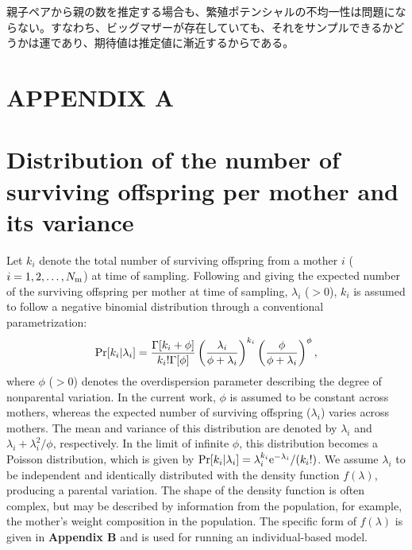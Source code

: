 \documentclass[12pt, English]{article}
\begin{document}
\begin{spacing}{1.9}
親子ペアから親の数を推定する場合も、繁殖ポテンシャルの不均一性は問題にならない。すなわち、ビッグマザーが存在していても、それをサンプルできるかどうかは運であり、期待値は推定値に漸近するからである。



\section*{APPENDIX A}
\setcounter{equation}{0}

\section*{Distribution of the number of surviving offspring per mother and its variance}

\renewcommand{\theequation}{A\arabic{equation}}

Let $k_i$ denote the total number of surviving offspring from a mother  $i$ ($i= 1, 2, \dots, N_{\rm m}$) at time of sampling. Following \cite{Akita_2019} and giving the expected number of the surviving offspring per mother at time of sampling, $\lambda_i$ ($>0$), $k_i$ is assumed to follow a negative binomial distribution through a conventional parametrization:
\begin{equation}
{\rm Pr}[ k_i | \lambda_i ] = \frac{\Gamma[k_i+\phi]}{k_i! \Gamma[\phi]} \left( \frac{\lambda_i}{\phi+\lambda_i} \right)^{k_i} \left( \frac{\phi}{\phi+\lambda_i} \right)^{\phi}, 
\label{NB}
\end{equation}
where $\phi$ ($>0$) denotes the overdispersion parameter describing the degree of nonparental variation. In the current work, $\phi$ is assumed to be constant across mothers, whereas the expected number of surviving offspring ($\lambda_i$) varies across mothers. The mean and variance of this distribution are denoted by $\lambda_i$ and $\lambda_i + \lambda_i^2/\phi$, respectively. In the limit of infinite $\phi$, this distribution becomes a Poisson distribution, which is given by ${\rm Pr}[ k_i | \lambda_i ]=\lambda_i^{k_i} \mathrm{e}^{-\lambda_i}/(k_i!)$. We assume $\lambda_i$ to be independent and identically distributed with the density function $f(\lambda)$, producing a parental variation. The shape of the density function is often complex, but may be described by information from the population, for example, the mother's weight composition in the population. The specific form of $f(\lambda)$ is given in {\bf Appendix B} and is used for running an individual-based model.  


\end{spacing}
\end{document}
